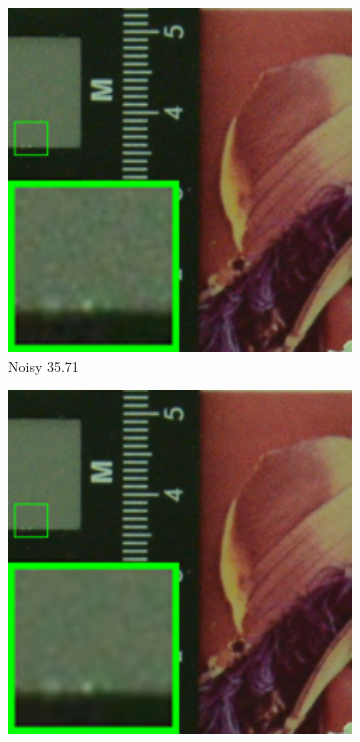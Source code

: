 \begin{figure}
    \centering
    \begin{subfigure}[t]{0.19\textwidth}
        \centering
        \includegraphics[width=1\textwidth]{images/mcwnnm/resize_br_Noisy_d800_iso1600_2.png}
		\caption{Noisy 35.71}
    \end{subfigure}
    \hfill
    \begin{subfigure}[t]{0.19\textwidth}
        \centering
        \includegraphics[width=1\textwidth]{images/mcwnnm/resize_br_CBM3D_CC15_d800_iso1600_2.png}

\end{subfigure}
\end{figure}
